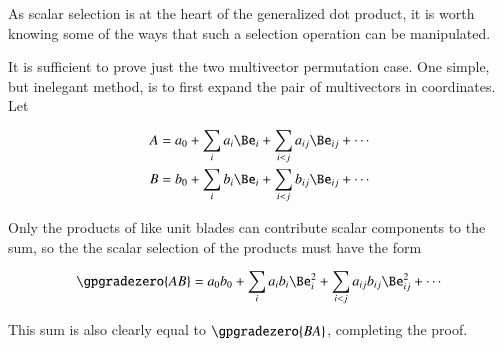 %
%
As scalar selection is at the heart of the
generalized dot product, it is worth knowing
some of the ways that such a selection operation can be manipulated.


It is sufficient to prove just the two multivector permutation case.
One simple, but inelegant method, is to first expand the pair of multivectors in coordinates.
Let

\begin{equation}\label{eqn:scalarSelectionPermutation:40}
\begin{aligned}
A &= a_0 + \sum_i a_i \Be_i + \sum_{i < j} a_{ij} \Be_{ij} + \cdots \\
B &= b_0 + \sum_i b_i \Be_i + \sum_{i < j} b_{ij} \Be_{ij} + \cdots
\end{aligned}
\end{equation}

Only the products of like unit blades can contribute scalar components to the sum, so the
the scalar selection of the products must have the form

\begin{dmath}\label{eqn:scalarSelectionPermutation:60}
\gpgradezero{ A B }
=
a_0 b_0 + \sum_i a_i b_i \Be_i^2 + \sum_{i < j} a_{ij} b_{ij} \Be_{ij}^2 + \cdots
\end{dmath}

This sum is also clearly equal to \( \gpgradezero{ B A } \), completing the proof.
